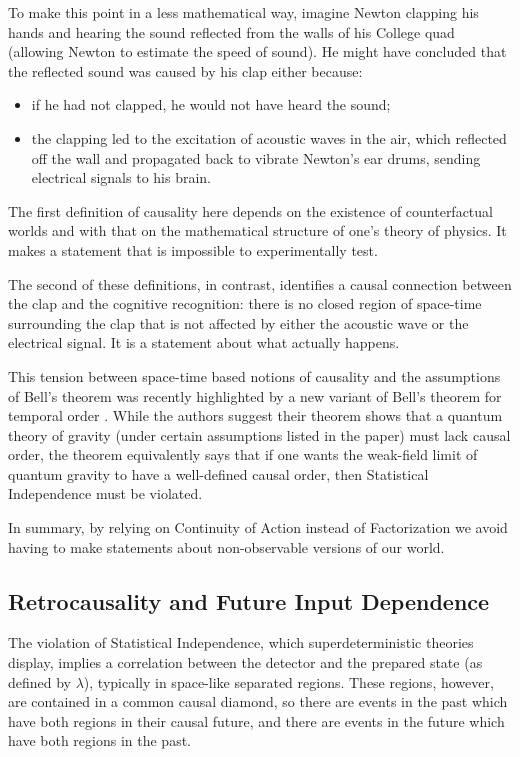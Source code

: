 \documentclass[12pt]{article}
\begin{document}
To make this point in a less mathematical way, imagine Newton clapping his hands and hearing the sound reflected from the walls of his College quad (allowing Newton to estimate the speed of sound). He might have concluded that the reflected sound was caused by his clap either because:
\begin{itemize}
\item if he had not clapped, he would not have heard the sound;
\item the clapping led to the excitation of acoustic waves in the air, which reflected off the wall and propagated back to vibrate Newton's ear drums, sending electrical signals to his brain.
\end{itemize}
The first definition of causality here depends on the existence of counterfactual worlds and 
with that on the mathematical structure of one's theory of physics. It makes a statement that is impossible to experimentally test.

The second of these definitions, in contrast, identifies a causal connection between the clap and the cognitive recognition: there is no closed region of space-time surrounding the clap that is not affected by either the acoustic wave or the electrical signal.  It is a statement about what actually happens. 

This tension between space-time based notions of causality and the assumptions of Bell's theorem was recently highlighted by a new variant of Bell's theorem for temporal order \cite{Zych:2017tau}. While the authors suggest their theorem shows that a quantum theory of gravity (under certain assumptions listed in the paper) must lack causal order, the theorem equivalently says that if one wants the weak-field limit of quantum gravity to have a well-defined causal order, then Statistical Independence must be violated.

In summary, by relying on Continuity of Action instead of Factorization we avoid having to make statements about non-observable versions of our world. 

\subsection{Retrocausality and Future Input Dependence}

The violation of Statistical Independence, which superdeterministic theories display, implies a correlation between the detector and the prepared state (as defined by $\lambda$), typically in space-like separated regions. These regions, however, are contained in a common causal diamond, so there are events in the past which have both regions in their causal future, and there are events in the future which have both regions in the past. 
\end{document}
